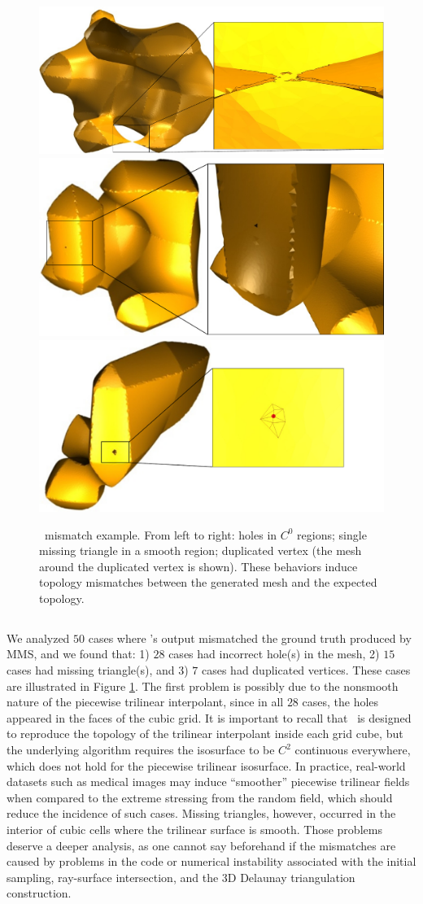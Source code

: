 \begin{figure}[t]
\centering
\includegraphics[width=0.33\linewidth,keepaspectratio=true]
{chapter3/figures/deliso-case-00.pdf}
\includegraphics[width=0.3\linewidth,keepaspectratio=true]
{chapter3/figures/deliso-case-02.pdf}
\includegraphics[width=0.29\linewidth,keepaspectratio=true]
{chapter3/figures/deliso-case-03.pdf}
\caption{\deliso\ mismatch example. From left to right: holes in $C^0$
  regions; single missing triangle in a smooth region; duplicated
  vertex (the mesh around the duplicated vertex is shown). These
  behaviors induce topology mismatches between the generated mesh and
  the expected topology.}
\label{fig:pproblem-deliso}
\end{figure}

\subsection{\deliso}
\label{sec:consistency:deliso}
We analyzed $50$ cases where \deliso's output mismatched the ground
truth produced by MMS, and we found that: 1) $28$ cases had incorrect
hole(s) in the mesh, 2) $15$ cases had missing triangle(s), and 3) $7$
cases had duplicated vertices.  These cases are illustrated in Figure
\ref{fig:pproblem-deliso}.  The first problem is possibly due to the
nonsmooth nature of the piecewise trilinear interpolant, since in all
$28$ cases, the holes appeared in the faces of the cubic grid. It is
important to recall that \deliso\ is designed to reproduce the
topology of the trilinear interpolant inside each grid cube, but the
underlying algorithm requires the isosurface to be $C^2$ continuous
everywhere, which does not hold for the piecewise trilinear
isosurface.
In practice, real-world datasets such as medical images may induce
``smoother'' piecewise trilinear fields when compared to the extreme
stressing from the random field, which should reduce the incidence of
such cases. Missing triangles, however, occurred in the interior of
cubic cells where the trilinear surface is smooth.
Those problems deserve a deeper analysis, as one cannot say beforehand
if the mismatches are caused by problems in the code or numerical
instability
associated with the initial sampling, ray-surface intersection, and the
3D Delaunay triangulation construction.

